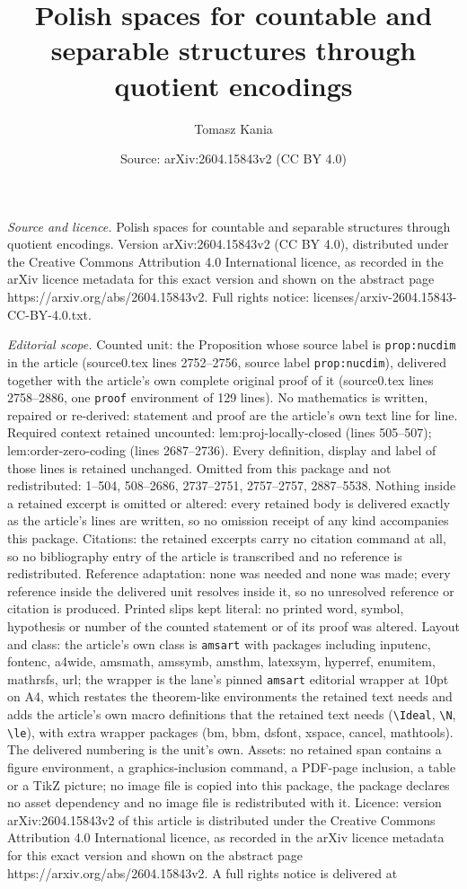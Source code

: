 \documentclass[10pt,a4paper]{amsart}
\title[Polish spaces for countable and separable structures through]{Polish spaces for countable and separable structures through quotient encodings}
\author{Tomasz Kania}
\date{Source: arXiv:2604.15843v2 (CC BY 4.0)}
\begin{document}
\maketitle

\noindent\emph{Source and licence.} Polish spaces for countable and separable structures through quotient encodings. Version arXiv:2604.15843v2 (CC BY 4.0), distributed under the Creative Commons Attribution 4.0 International licence, as recorded in the arXiv licence metadata for this exact version and shown on the abstract page https://arxiv.org/abs/2604.15843v2. Full rights notice: licenses/arxiv-2604.15843-CC-BY-4.0.txt.\par\smallskip

\noindent\textit{Editorial scope.} Counted unit: the Proposition whose source label is \texttt{prop:nucdim} in the article (source0.tex lines 2752--2756, source label \texttt{prop:nucdim}), delivered together with the article's own complete original proof of it (source0.tex lines 2758--2886, one \texttt{proof} environment of 129 lines). No mathematics is written, repaired or re-derived: statement and proof are the article's own text line for line. Required context retained uncounted: lem:proj-locally-closed (lines 505--507); lem:order-zero-coding (lines 2687--2736). Every definition, display and label of those lines is retained unchanged. Omitted from this package and not redistributed: 1--504, 508--2686, 2737--2751, 2757--2757, 2887--5538. Nothing inside a retained excerpt is omitted or altered: every retained body is delivered exactly as the article's lines are written, so no omission receipt of any kind accompanies this package. Citations: the retained excerpts carry no citation command at all, so no bibliography entry of the article is transcribed and no reference is redistributed. Reference adaptation: none was needed and none was made; every reference inside the delivered unit resolves inside it, so no unresolved reference or citation is produced. Printed slips kept literal: no printed word, symbol, hypothesis or number of the counted statement or of its proof was altered. Layout and class: the article's own class is \texttt{amsart} with packages including inputenc, fontenc, a4wide, amsmath, amssymb, amsthm, latexsym, hyperref, enumitem, mathrsfs, url; the wrapper is the lane's pinned \texttt{amsart} editorial wrapper at 10pt on A4, which restates the theorem-like environments the retained text needs and adds the article's own macro definitions that the retained text needs (\texttt{\textbackslash Ideal}, \texttt{\textbackslash N}, \texttt{\textbackslash le}), with extra wrapper packages (bm, bbm, dsfont, xspace, cancel, mathtools). The delivered numbering is the unit's own. Assets: no retained span contains a figure environment, a graphics-inclusion command, a PDF-page inclusion, a table or a TikZ picture; no image file is copied into this package, the package declares no asset dependency and no image file is redistributed with it. Licence: version arXiv:2604.15843v2 of this article is distributed under the Creative Commons Attribution 4.0 International licence, as recorded in the arXiv licence metadata for this exact version and shown on the abstract page https://arxiv.org/abs/2604.15843v2. A full rights notice is delivered at 
\end{document}
